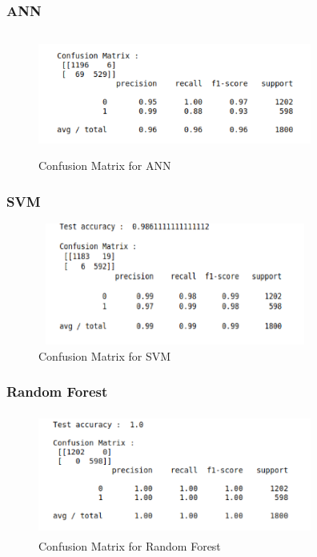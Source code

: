 \subsubsection{ANN}

\begin{figure}[H]
  \includegraphics[height = 4cm,width= 9cm]{images/6_ANN}
\caption{Confusion Matrix for ANN}
\end{figure}

\subsubsection{SVM}

\begin{figure}[H]
  \includegraphics[height = 4cm,width= 9cm]{images/6_SWM}
\caption{Confusion Matrix for SVM}  
  \end{figure}

\subsubsection{Random Forest}

\begin{figure}[H]
  \includegraphics[height = 4cm,width= 9cm]{images/6_rand}
\caption{Confusion Matrix for Random Forest}
\end{figure}

